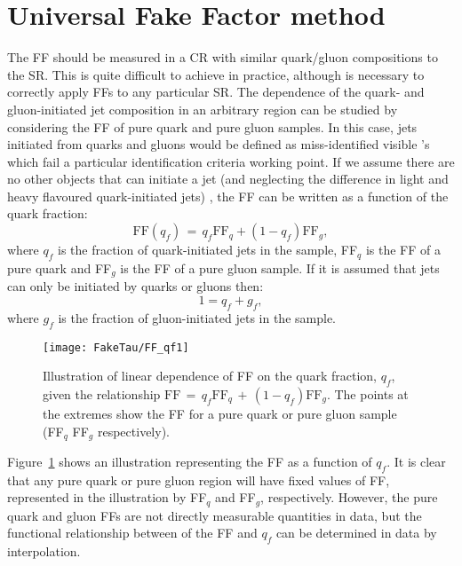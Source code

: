 	\section{Universal Fake Factor method} 
	\label{sec:uniffmeth}
	The \ac{FF} should be measured in a \ac{CR} with similar quark/gluon compositions to the \ac{SR}. This is quite difficult to achieve in practice, although is necessary to correctly apply \ac{FF}s to any particular \ac{SR}. The dependence of the quark- and gluon-initiated jet composition in an arbitrary region can be studied by considering the \ac{FF} of pure quark and pure gluon samples. In this case, jets initiated from quarks and gluons would be defined as miss-identified visible \htau's which fail a particular identification criteria working point. If we assume there are no other objects that can initiate a jet (and neglecting the difference in light and heavy flavoured quark-initiated jets)%
, the \ac{FF} can be written as a function of the quark fraction:
	\begin{equation}
	\textrm{FF}(q_f)\,=\,q_f\textrm{FF}_q+(1-q_f)\textrm{FF}_g,
	\label{eq:FF_qf}
	\end{equation}		
	where $q_f$ is the fraction of quark-initiated jets in the sample, FF$_q$ is the \ac{FF} of a pure quark and FF$_g$ is the \ac{FF} of a pure gluon sample. If it is assumed that jets can only be initiated by quarks or gluons then:
	\begin{equation}
		1=q_f+g_f,
	\end{equation}		 
	 where $g_f$ is the fraction of gluon-initiated jets in the sample.
	 
	 \begin{figure}[!hbt]
	 \centering
	\texttt{[image: FakeTau/FF\_qf1]}
	\caption{Illustration of linear dependence of FF on the quark fraction, $q_f$, given the relationship $\textrm{FF}\,=\,q_f\textrm{FF}_q\,+\,(1-q_f)\textrm{FF}_g$. The points at the extremes show the \ac{FF} for a pure quark or pure gluon sample (FF$_q$ FF$_g$ respectively).}
	 \label{fig:FF_qf1}
	 \end{figure}
	Figure~\ref{fig:FF_qf1} shows an illustration representing the FF as a function of $q_f$.
	It is clear that any pure quark or pure gluon region will have fixed values of \ac{FF}, represented in the illustration by FF$_q$ and FF$_g$, respectively.	
	However, the pure quark and gluon FFs are not directly measurable quantities in data, but the functional relationship between of the FF and $q_f$ can be determined in data by interpolation. 
	
